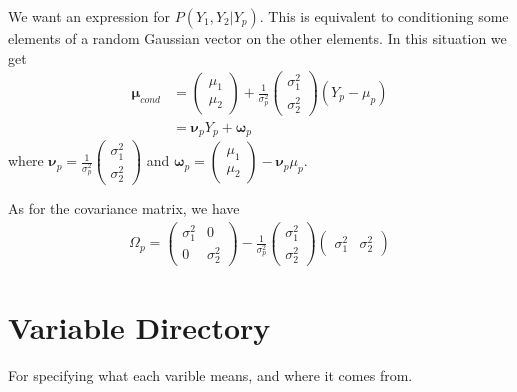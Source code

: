 \documentclass[a4paper,12pt]{article}
\theoremstyle{definition}
\begin{document}
We want an expression for $P(Y_1, Y_2 | Y_p)$. This is equivalent to conditioning some elements of a random Gaussian vector on the other elements. In this situation we get
\begin{align*}
	\boldsymbol{\mu}_{cond} &= 	\begin{pmatrix}
																\mu_1 \\
																\mu_2
															\end{pmatrix}
															+ \frac{1}{\sigma_p^2}
															\begin{pmatrix}
																\sigma_1^2 \\
																\sigma_2^2
															\end{pmatrix}
															(Y_p - \mu_p) \\
													&=	\boldsymbol{\nu}_p Y_p + \boldsymbol{\omega}_p
\end{align*}
where $\boldsymbol{\nu}_p = \frac{1}{\sigma_p^2} \begin{pmatrix} \sigma_1^2 \\ \sigma_2^2 \end{pmatrix}$ and $\boldsymbol{\omega}_p = \begin{pmatrix} \mu_1 \\ \mu_2 \end{pmatrix} - \boldsymbol{\nu}_p \mu_p$.

As for the covariance matrix, we have
\begin{align*}
 	\Omega_p	=	\begin{pmatrix}
								\sigma_1^2	&	0						\\
								0						&	\sigma_2^2
							\end{pmatrix}
							- \frac{1}{\sigma_p^2}
							\begin{pmatrix}
								\sigma_1^2 \\
								\sigma_2^2
							\end{pmatrix}
							\begin{pmatrix}
								\sigma_1^2 &	\sigma_2^2
							\end{pmatrix}
\end{align*}

\section{Variable Directory}
For specifying what each varible means, and where it comes from.
\end{document}

